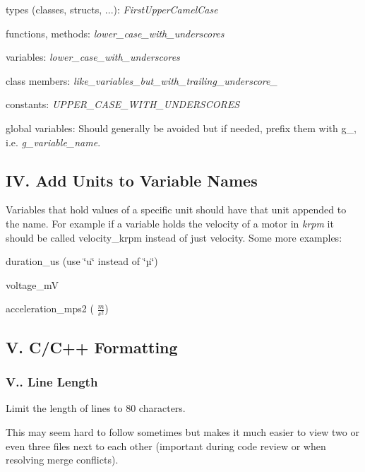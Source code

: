 \begin{DoxyItemize}
\item types (classes, structs, ...)\+: {\itshape First\+Upper\+Camel\+Case}
\item functions, methods\+: {\itshape lower\+\_\+case\+\_\+with\+\_\+underscores}
\item variables\+: {\itshape lower\+\_\+case\+\_\+with\+\_\+underscores}
\item class members\+: {\itshape like\+\_\+variables\+\_\+but\+\_\+with\+\_\+trailing\+\_\+underscore\+\_\+}
\item constants\+: {\itshape U\+P\+P\+E\+R\+\_\+\+C\+A\+S\+E\+\_\+\+W\+I\+T\+H\+\_\+\+U\+N\+D\+E\+R\+S\+C\+O\+R\+ES}
\item global variables\+: Should generally be avoided but if needed, prefix them with g\+\_\+, i.\+e. {\itshape g\+\_\+variable\+\_\+name}.
\end{DoxyItemize}

\subsection*{IV. Add Units to Variable Names}

Variables that hold values of a specific unit should have that unit appended to the name. For example if a variable holds the velocity of a motor in {\itshape krpm} it should be called {\ttfamily velocity\+\_\+krpm} instead of {\ttfamily just velocity}. Some more examples\+:


\begin{DoxyItemize}
\item duration\+\_\+us (use \char`\"{}u\char`\"{} instead of \char`\"{}µ\char`\"{})
\item voltage\+\_\+mV
\item acceleration\+\_\+mps2 ( $ \frac{m}{s^2} $)
\end{DoxyItemize}

\subsection*{V. C/\+C++ Formatting}

\subsubsection*{V.. Line Length}

Limit the length of lines to 80 characters.

This may seem hard to follow sometimes but makes it much easier to view two or even three files next to each other (important during code review or when resolving merge conflicts).

